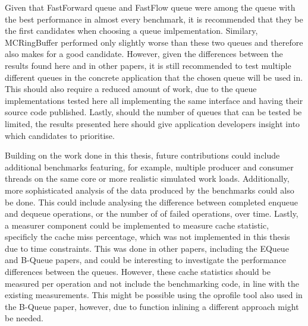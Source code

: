 Given that FastForward queue and FastFlow queue were among the queue with the best performance in almost
every benchmark, it is recommended that they be the first candidates when choosing a queue imlpementation.
Similary, MCRingBuffer performed only slightly worse than these two queues and therefore also makes for a
good candidate.
However, given the differences between the results found here and in other papers, it is still recommended to
test multiple different queues in the concrete application that the chosen queue will be used in.
This should also require a reduced amount of work, due to the queue implementations tested here all
implementing the same interface and having their source code published.
Lastly, should the number of queues that can be tested be limited, the results presented here should give
application developers insight into which candidates to prioritise.

Building on the work done in this thesis, future contributions could include additional benchmarks featuring,
for example, multiple producer and consumer threads on the same core or more realistic simulated work loads.
Additionally, more sophisticated analysis of the data produced by the benchmarks could also be done.
This could include analysing the difference between completed enqueue and dequeue operations, or the number of
of failed operations, over time.
Lastly, a measurer component could be implemented to measure cache statistic, specificly the cache miss
percentage, which was not implemented in this thesis due to time constraints.
This was done in other papers, including the EQueue and B-Queue papers, and could be interesting to
investigate the performance differences between the queues.
However, these cache statistics should be measured per operation and not include the benchmarking code,
in line with the existing measurements.
This might be possible using the oprofile tool also used in the B-Queue paper, however, due to function
inlining a different approach might be needed.
